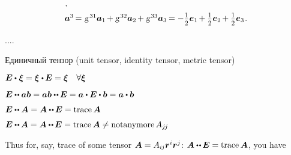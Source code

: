 \begin{otherlanguage}{russian}
\begin{tcolorbox}
\[\begin{array}{l}
\hspace{.1ex} ,
\\[.5em]
%
\bm{a}^3 \hspace{-0.2ex}=\hspace{.1ex} \textsl{g}^{\hspace{.2ex}31} \bm{a}_1 \hspace{-0.2ex} + \textsl{g}^{\hspace{.2ex}32} \bm{a}_2 \hspace{-0.2ex} + \textsl{g}^{\hspace{.2ex}33} \bm{a}_3 \hspace{-0.2ex} = - \smalldisplaystyleonehalf \bm{e}_1 \hspace{-0.2ex} + \smalldisplaystyleonehalf \bm{e}_2 \hspace{-0.2ex} + \smalldisplaystyleonehalf \bm{e}_3
\hspace{.16ex} .
\end{array}\]

\par\end{tcolorbox}

....


Единичный тензор
(unit tensor, identity tensor, metric tensor)

$\UnitDyad \dotp \hspace{.1ex} \bm{\xi} = \bm{\xi} \hspace{.1ex} \dotp \hspace{-0.12ex} \UnitDyad = \bm{\xi} \quad \forall \bm{\xi}$

$\UnitDyad \dotdotp \bm{a} \bm{b} = \bm{a} \bm{b} \dotdotp \hspace{-0.12ex} \UnitDyad = \bm{a} \dotp \UnitDyad \dotp \bm{b} = \bm{a} \dotp \bm{b}$

$\UnitDyad \dotdotp \bm{A} = \bm{A} \dotdotp \hspace{-0.12ex} \UnitDyad = \trace{\hspace{-0.1ex}\bm{A}}$

$\UnitDyad \dotdotp \hspace{-0.1ex} \bm{A} = \bm{A} \dotdotp \hspace{-0.12ex} \UnitDyad = \trace{\hspace{-0.1ex}\bm{A}} \neq \operatorname{not anymore} A_{j\hspace{-0.12ex}j}$

Thus for, say, trace of some tensor ${\bm{A} = A_{i\hspace{-0.1ex}j} \bm{r}^i \bm{r}^j}$: ${\bm{A} \dotdotp \hspace{-0.12ex} \UnitDyad = \trace{\hspace{-0.1ex}\bm{A}}}$, you have


\end{otherlanguage}
